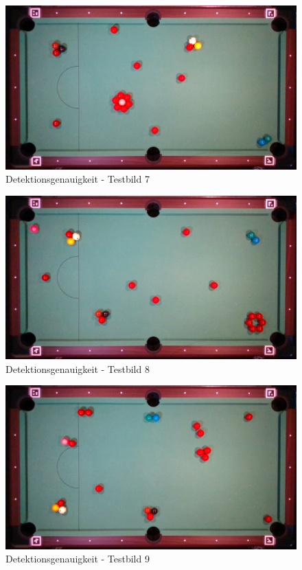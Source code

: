 \begin{figure}[h!]
    \begin{center}
        \includegraphics[width=0.8\linewidth]{../common/07_appendix/resources/00_detection/06_detektion_testbild_7.png}
    \end{center}
    \caption{Detektionsgenauigkeit - Testbild 7}
    \label{fig:detektionsgenauigkeit:testbild:7}
\end{figure}
\begin{figure}[h!]
    \begin{center}
        \includegraphics[width=0.8\linewidth]{../common/07_appendix/resources/00_detection/07_detektion_testbild_8.png}
    \end{center}
    \caption{Detektionsgenauigkeit - Testbild 8}
    \label{fig:detektionsgenauigkeit:testbild:8}
\end{figure}
\begin{figure}[h!]
    \begin{center}
        \includegraphics[width=0.8\linewidth]{../common/07_appendix/resources/00_detection/08_detektion_testbild_9.png}
    \end{center}
    \caption{Detektionsgenauigkeit - Testbild 9}
    \label{fig:detektionsgenauigkeit:testbild:9}
\end{figure}
